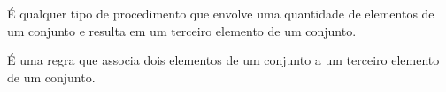 \documentclass[../../main]{subfiles}
\begin{document}
    \begin{defi}\label{defi:operacao-matematica}
        É qualquer tipo de procedimento que envolve uma quantidade de elementos de um conjunto e resulta em um terceiro elemento de um conjunto.
    \end{defi}

    \begin{defi}\label{defi:operacao-binaria}
        É uma regra que associa dois elementos de um conjunto a um terceiro elemento de um conjunto.
    \end{defi}
\end{document}
